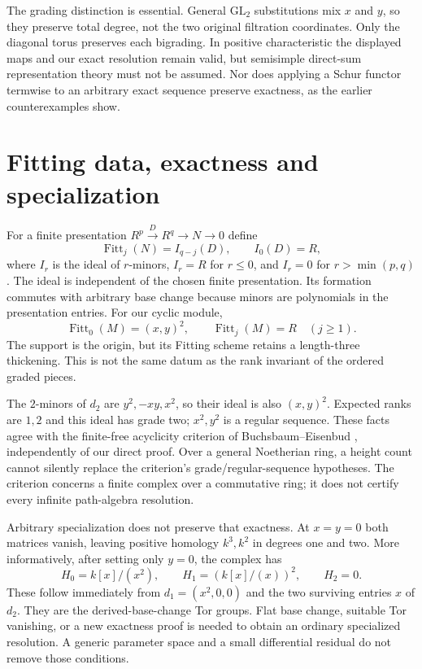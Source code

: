 The grading distinction is essential. General $\mathrm{GL}_2$ substitutions
mix $x$ and $y$, so they preserve total degree, not the two original
filtration coordinates. Only the diagonal torus preserves each bigrading.
In positive characteristic the displayed maps and our exact resolution
remain valid, but semisimple direct-sum representation theory must not
be assumed. Nor does applying a Schur functor termwise to an arbitrary
exact sequence preserve exactness, as the earlier counterexamples show.

\section{Fitting data, exactness and specialization}
For a finite presentation $R^p\xrightarrow D R^q\to N\to0$ define
\[
 \operatorname{Fitt}_j(N)=I_{q-j}(D),\qquad
 I_0(D)=R,
\]
where $I_r$ is the ideal of $r$-minors, $I_r=R$ for $r\le0$, and
$I_r=0$ for $r>\min(p,q)$. The ideal is independent of the chosen finite
presentation. Its formation commutes with arbitrary base change because
minors are polynomials in the presentation entries. For our cyclic module,
\[
 \operatorname{Fitt}_0(M)=(x,y)^2,\qquad
 \operatorname{Fitt}_j(M)=R\quad(j\ge1).
\]
The support is the origin, but its Fitting scheme retains a length-three
thickening. This is not the same datum as the rank invariant of the
ordered graded pieces.

The $2$-minors of $d_2$ are $y^2,-xy,x^2$, so their ideal is also
$(x,y)^2$. Expected ranks are $1,2$ and this ideal has grade two;
$x^2,y^2$ is a regular sequence. These facts agree with the finite-free
acyclicity criterion of Buchsbaum--Eisenbud \cite{PersBE}, independently
of our direct proof. Over a general Noetherian ring, a height count cannot
silently replace the criterion's grade/regular-sequence hypotheses.
The criterion concerns a finite complex over a commutative ring; it does
not certify every infinite path-algebra resolution.

Arbitrary specialization does not preserve that exactness. At $x=y=0$
both matrices vanish, leaving positive homology $k^3,k^2$ in degrees
one and two. More informatively, after setting only $y=0$, the complex
has
\[
 H_0=k[x]/(x^2),\qquad H_1=(k[x]/(x))^2,\qquad H_2=0.
\]
These follow immediately from $d_1=(x^2,0,0)$ and the two surviving
entries $x$ of $d_2$. They are the derived-base-change Tor groups.
Flat base change, suitable Tor vanishing, or a new exactness proof is
needed to obtain an ordinary specialized resolution. A generic parameter
space and a small differential residual do not remove those conditions.

